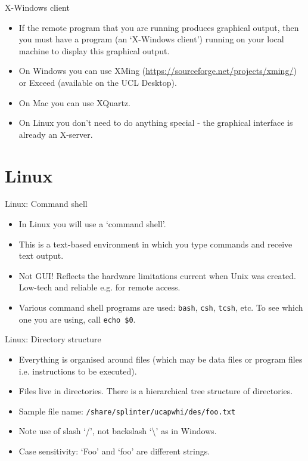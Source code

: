 \documentclass{beamer}
\begin{document}
\begin{frame}{X-Windows client}
  \begin{itemize}
    \item If the remote program that you are running produces graphical output, then you must have a program (an `X-Windows client') running on your local machine to display this graphical output.
    \item On Windows you can use XMing (\url{https://sourceforge.net/projects/xming/}) or Exceed (available on the UCL Desktop).
    \item On Mac you can use XQuartz.
    \item On Linux you don't need to do anything special - the graphical interface is already an X-server.
  \end{itemize}
\end{frame}


\section{Linux}

\begin{frame}{Linux: Command shell}
  \begin{itemize}
    \item{In Linux you will use a `command shell'.}
    \item{This is a text-based environment in which you type commands and receive text output.}
    \item{Not GUI! Reflects the hardware limitations current when Unix was created. Low-tech and reliable e.g. for remote access.}
    \item{Various command shell programs are used: \texttt{bash}, \texttt{csh}, \texttt{tcsh}, etc. To see which one you are using, call \texttt{echo \$0}.}
   \end{itemize}
\end{frame}

\begin{frame}{Linux: Directory structure}
  \begin{itemize}
    \item{Everything is organised around files (which may be data files or program files i.e. instructions to be executed).}
    \item{Files live in directories. There is a hierarchical tree structure of directories.}
    \item{Sample file name: \texttt{/share/splinter/ucapwhi/des/foo.txt}}
    \item{Note use of slash `/', not backslash `\textbackslash' as in Windows.}
    \item{Case sensitivity: `Foo' and `foo' are different strings.}
  \end{itemize}
\end{frame}
\end{document}
